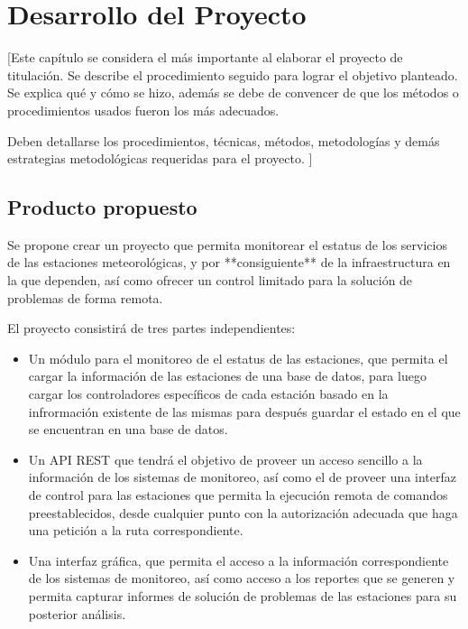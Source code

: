 \chapter{Desarrollo del Proyecto}
[Este capítulo se considera el más importante al elaborar el proyecto de titulación. Se describe el procedimiento seguido para lograr el objetivo planteado. Se explica qué y cómo se hizo, además se debe de convencer de que los métodos o procedimientos usados fueron los más adecuados.

Deben detallarse los procedimientos, técnicas, métodos, metodologías y demás estrategias metodológicas requeridas para el proyecto.
]

\section{Producto propuesto}

Se propone crear un proyecto que permita monitorear el estatus de los servicios de las estaciones meteorológicas, y por **consiguiente** de la infraestructura en la que dependen, así como ofrecer un control limitado para la solución de problemas de forma remota.

El proyecto consistirá de tres partes independientes:

\begin{itemize}
   \item Un módulo para el monitoreo de el estatus de las estaciones, que permita el cargar la información de las estaciones de una base de datos, para luego cargar los controladores específicos de cada estación basado en la infrormación existente de las mismas para después guardar el estado en el que se encuentran en una base de datos.

   \item Un API REST que tendrá el objetivo de proveer un acceso sencillo a la información de los sistemas de monitoreo, así como el de proveer una interfaz de control para las estaciones que permita la ejecución remota de comandos preestablecidos, desde cualquier punto con la autorización adecuada que haga una petición a la ruta correspondiente.

   \item Una interfaz gráfica, que permita el acceso a la información correspondiente de los sistemas de monitoreo, así como acceso a los reportes que se generen y permita capturar informes de solución de problemas de las estaciones para su posterior análisis.

\end{itemize}

